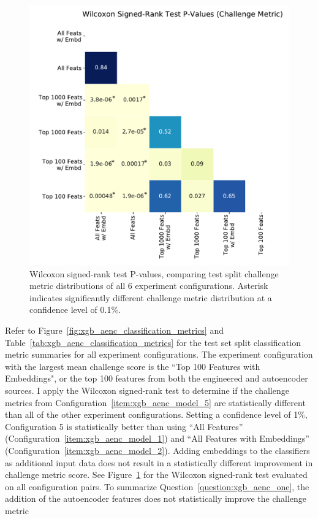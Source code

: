 \documentclass[\main/thesis.tex]{subfiles}
\begin{document}
\begin{figure}[t]
    \centering
    \includegraphics[width=12cm]{figure/xgb_aenc_wilcoxon_srt_p_vals.pdf}
    \caption[Wilcoxon signed-rank test P-values, comparing test split challenge metric distributions of all 6 experiment configurations.]{Wilcoxon signed-rank test P-values, comparing test split challenge metric distributions of all 6 experiment configurations. Asterisk indicates significantly different challenge metric distribution at a confidence level of 0.1\%.}
    \label{fig:xgb_aenc_wilcoxon_srt_p_vals}
\end{figure}

Refer to Figure~\ref{fig:xgb_aenc_classification_metrics} and Table~\ref{tab:xgb_aenc_classification_metrics} for the test set split classification metric summaries for all experiment configurations.
The experiment configuration with the largest mean challenge score is the ``Top 100 Features with Embeddings", or the top 100 features from both the engineered and autoencoder sources.
I apply the Wilcoxon signed-rank test to determine if the challenge metrics from Configuration~\ref{item:xgb_aenc_model_5} are statistically different than all of the other experiment configurations.
Setting a confidence level of 1\%, Configuration 5 is statistically better than using ``All Features'' (Configuration~\ref{item:xgb_aenc_model_1}) and ``All Features with Embeddings'' (Configuration~\ref{item:xgb_aenc_model_2}).
Adding embeddings to the classifiers as additional input data does not result in a statistically different improvement in challenge metric score.
See Figure~\ref{fig:xgb_aenc_wilcoxon_srt_p_vals} for the Wilcoxon signed-rank test evaluated on all configuration pairs.
To summarize Question~\ref{question:xgb_aenc_one}, the addition of the autoencoder features does not statistically improve the challenge metric
\end{document}
